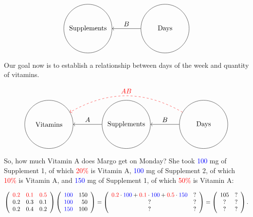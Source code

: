 \begin{example}
$$\begin{tikzpicture}
\node(S)[draw,circle,minimum size=2.5cm,inner sep=1pt] at (4,0) {Supplements};
\node(D)[draw,circle,minimum size=2.5cm,inner sep=1pt] at (8,0) {Days};

\draw[->] (D) --node[above]{$B$} (S);

\end{tikzpicture}$$

Our goal now is to establish a relationship between days of the week and quantity of vitamins.

$$\begin{tikzpicture}
\node(S)[draw,circle,minimum size=2.5cm,inner sep=1pt] at (4,0) {Supplements};
\node(V)[draw,circle,minimum size=2.5cm,inner sep=1pt] at (0,0) {Vitamins};
\node(D)[draw,circle,minimum size=2.5cm,inner sep=1pt] at (8,0) {Days};

\draw[->] (S) --node[above]{$A$} (V);
\draw[->] (D) --node[above]{$B$} (S);

\draw [->, dashed, red] (D) to [out=150,in=30] node[above]{$AB$} (V);


\end{tikzpicture}$$

So, how much Vitamin A does Margo get on Monday?  She took \textcolor{blue}{100} mg of Supplement 1, of which \textcolor{red}{20\%} is Vitamin A, \textcolor{blue}{100} mg of Supplement 2, of which \textcolor{red}{10\%} is Vitamin A, and \textcolor{blue}{150} mg of Supplement 1, of which \textcolor{red}{50\%} is Vitamin A:

$$\left( \begin{array}{rrr}
\textcolor{red}{0.2} & \textcolor{red}{0.1} & \textcolor{red}{0.5}\\
0.2 & 0.3 & 0.1\\
0.2 & 0.4 & 0.2
\end{array}\right)\left( \begin{array}{rrr}
\textcolor{blue}{100} & 150\\
\textcolor{blue}{100} & 50\\
\textcolor{blue}{150} & 100
\end{array}\right)=\left( \begin{array}{cr}
\textcolor{red}{0.2}\cdot\textcolor{blue}{100}+\textcolor{red}{0.1}\cdot\textcolor{blue}{100}+\textcolor{red}{0.5}\cdot\textcolor{blue}{150} & ? \\
? & ? \\
? & ? 
\end{array}\right)=\left( \begin{array}{cr}
105 & ? \\
? & ? \\
? & ? 
\end{array}\right).$$


\end{example}
